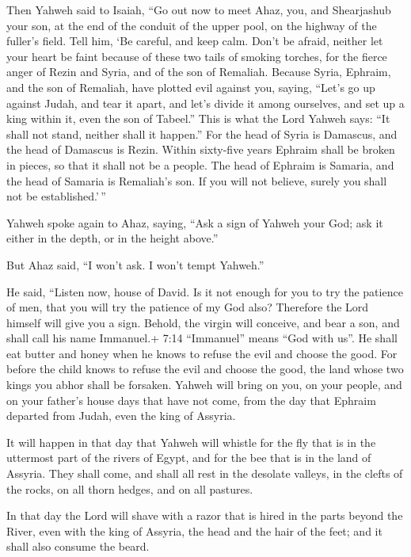  Then Yahweh said to Isaiah, ``Go out now to meet Ahaz, you,
and Shearjashub your son, at the end of the conduit of the upper pool,
on the highway of the fuller's field.  Tell him, `Be
careful, and keep calm. Don't be afraid, neither let your heart be faint
because of these two tails of smoking torches, for the fierce anger of
Rezin and Syria, and of the son of Remaliah.  Because Syria,
Ephraim, and the son of Remaliah, have plotted evil against you, saying,
 ``Let's go up against Judah, and tear it apart, and let's
divide it among ourselves, and set up a king within it, even the son of
Tabeel.''  This is what the Lord Yahweh says: ``It shall not
stand, neither shall it happen.''  For the head of Syria is
Damascus, and the head of Damascus is Rezin. Within sixty-five years
Ephraim shall be broken in pieces, so that it shall not be a people.
 The head of Ephraim is Samaria, and the head of Samaria is
Remaliah's son. If you will not believe, surely you shall not be
established.'\,''

 Yahweh spoke again to Ahaz, saying,  ``Ask a
sign of Yahweh your God; ask it either in the depth, or in the height
above.''

 But Ahaz said, ``I won't ask. I won't tempt Yahweh.''

 He said, ``Listen now, house of David. Is it not enough
for you to try the patience of men, that you will try the patience of my
God also?  Therefore the Lord himself will give you a sign.
Behold, the virgin will conceive, and bear a son, and shall call his
name Immanuel.+ 7:14 ``Immanuel'' means ``God with us''. 
He shall eat butter and honey when he knows to refuse the evil and
choose the good.  For before the child knows to refuse the
evil and choose the good, the land whose two kings you abhor shall be
forsaken.  Yahweh will bring on you, on your people, and on
your father's house days that have not come, from the day that Ephraim
departed from Judah, even the king of Assyria.

 It will happen in that day that Yahweh will whistle for
the fly that is in the uttermost part of the rivers of Egypt, and for
the bee that is in the land of Assyria.  They shall come,
and shall all rest in the desolate valleys, in the clefts of the rocks,
on all thorn hedges, and on all pastures.

 In that day the Lord will shave with a razor that is hired
in the parts beyond the River, even with the king of Assyria, the head
and the hair of the feet; and it shall also consume the beard.

